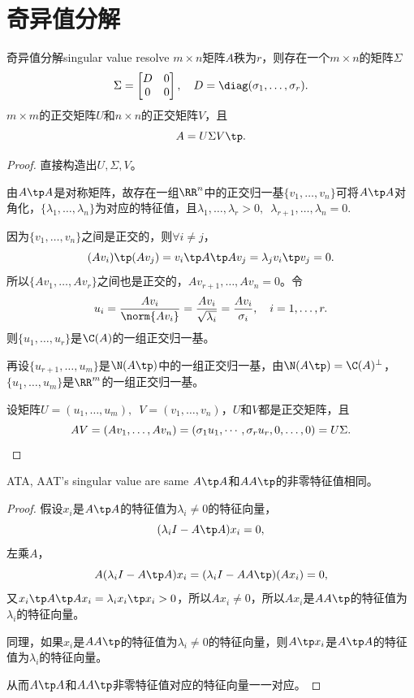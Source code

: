 \section{奇异值分解}
\begin{theorem}{奇异值分解}{singular value resolve}
	$m\times n$矩阵$A$秩为$r$，则存在一个$m\times n$的矩阵$\Sigma$ 
	\[
		\Sigma=\begin{bmatrix}
			D&0\\0&0
		\end{bmatrix},\quad D=\diag(\sigma_1,\ldots,\sigma_r).
	\]
	$m\times m$的正交矩阵$U$和$n\times n$的正交矩阵$V$，且 
	\[
		A=U\Sigma V\tp.
	\]
\end{theorem}
\begin{proof}
	直接构造出$U,\Sigma,V$。
	
	由$A\tp A$是对称矩阵，故存在一组$\RR^n$中的正交归一基$\{v_1,\ldots,v_n\}$可将$A\tp A$对角化，$\{\lambda_1,\ldots,\lambda_n\}$为对应的特征值，且$\lambda_1,\ldots,\lambda_r>0,\enspace\lambda_{r+1},\ldots,\lambda_n=0.$
	
	因为$\{v_1,\ldots,v_n\}$之间是正交的，则$\forall i\neq j$，
	\[
		(Av_i)\tp(Av_j)=v_i\tp A\tp Av_j=\lambda_jv_i\tp v_j=0.
	\]
	所以$\{Av_1,\ldots,Av_r\}$之间也是正交的，$Av_{r+1},\ldots,Av_n=0$。令
	\[
		u_i=\frac{Av_i}{\norm{Av_i}}=\frac{Av_i}{\sqrt{\lambda_i}}=\frac{Av_i}{\sigma_i},\quad i=1,\ldots,r.
	\]
	则$\{u_1,\ldots,u_r\}$是$\C(A)$的一组正交归一基。
	
	再设$\{u_{r+1},\ldots,u_m\}$是$\N(A\tp)$中的一组正交归一基，由$\N(A\tp)=\C(A)^\perp$，$\{u_1,\ldots,u_m\}$是$\RR^m$的一组正交归一基。
	
	设矩阵$U=(u_1,\ldots,u_m),\enspace V=(v_1,\ldots,v_n)$，$U$和$V$都是正交矩阵，且
	\[
		AV=(Av_1,\ldots,Av_n)=(\sigma_1u_1,\cdots,\sigma_ru_r,0,\ldots,0)=U\Sigma.
		\qedhere
	\]
\end{proof}
\begin{theorem}{}{ATA, AAT's singular value are same}
	$A\tp A$和$AA\tp$的非零特征值相同。
\end{theorem}
\begin{proof}
	假设$x_i$是$A\tp A$的特征值为$\lambda_i\neq 0$的特征向量，
	\[
		(\lambda_iI-A\tp A)x_i=0,
	\]
	左乘$A$，
	\[
		A(\lambda_iI-A\tp A)x_i=(\lambda_iI-AA\tp)(Ax_i)=0,
	\]
	又$x_i\tp A\tp Ax_i=\lambda_i x_i\tp x_i>0$，所以$Ax_i\neq 0$，所以$Ax_i$是$AA\tp$的特征值为$\lambda_i$的特征向量。
	
	同理，如果$x_i$是$AA\tp$的特征值为$\lambda_i\neq 0$的特征向量，则$A\tp x_i$是$A\tp A$的特征值为$\lambda_i$的特征向量。
	
	从而$A\tp A$和$AA\tp$非零特征值对应的特征向量一一对应。
\end{proof}

